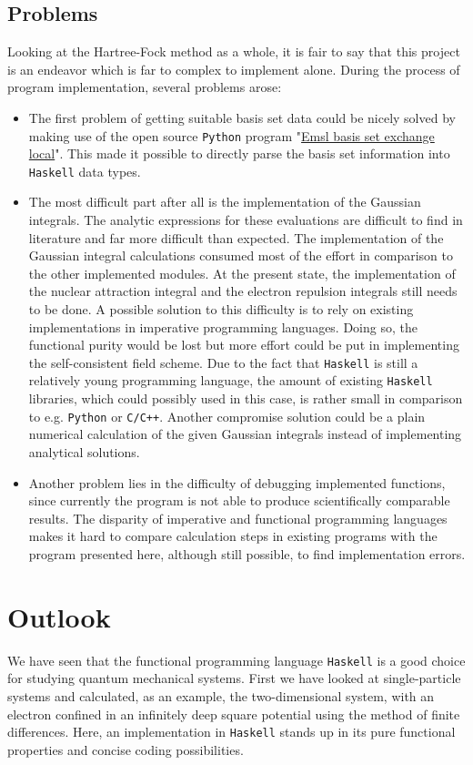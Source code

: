 \documentclass[twoside,        %
			   11pt,			%
               BCOR10mm,       %
               ngerman,english  %
               ]{scrartcl}
\begin{document}
\subsection{Problems}
Looking at the Hartree-Fock method as a whole, it is fair to say that this project is an 	endeavor which is far to complex to implement alone. During the process of program implementation, several problems arose:
\begin{itemize}
\item The first problem of getting suitable basis set data could be nicely solved by making use of the open source \texttt{Python} program  "\href{https://github.com/TApplencourt/EMSL_Basis_Set_Exchange_Local.git}{Emsl basis set exchange local}". This made it possible to directly parse the basis set information into \texttt{Haskell} data types.
\item The most difficult part after all is the implementation of the Gaussian integrals. The analytic expressions for these evaluations are difficult to find in literature and far more difficult than expected. The implementation of the Gaussian integral calculations consumed most of the effort in comparison to the other implemented modules. At the present state, the implementation of the nuclear attraction integral and the electron repulsion integrals still needs to be done. A possible solution to this difficulty is to rely on existing implementations in imperative programming languages. Doing so, the functional purity would be lost but more effort could be put in implementing the self-consistent field scheme. Due to the fact that \texttt{Haskell} is still a relatively young programming language, the amount of existing \texttt{Haskell} libraries, which could possibly used in this case, is rather small in comparison to e.g. \texttt{Python} or \texttt{C/C++}. Another compromise solution could be a plain numerical calculation of the given Gaussian integrals instead of implementing analytical solutions.
\item Another problem lies in the difficulty of debugging implemented functions, since currently the program is not able to produce scientifically comparable results. The disparity of imperative and functional programming languages makes it hard to compare calculation steps in existing programs with the program presented here, although still possible, to find implementation errors.
\end{itemize}

\section{Outlook}
We have seen that the functional programming language \texttt{Haskell} is a good choice for studying quantum mechanical systems. First we have looked at single-particle systems and calculated, as an example, the two-dimensional system, with an electron confined in an infinitely deep square potential using the method of finite differences. Here, an implementation in \texttt{Haskell} stands up in its pure functional properties and concise coding possibilities.
\end{document}
